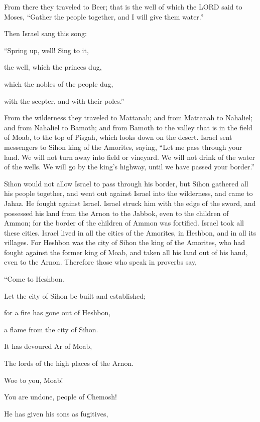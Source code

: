 \myverse{}From there they traveled to Beer; that is the well of which
the LORD said to Moses, “Gather the people together, and I will give them water.”


\myverse{}Then Israel sang this song:

“Spring up, well! Sing to it,


\myverse{}the well, which the princes dug,

which the nobles of the people dug,

with the scepter, and with their poles.”

From the wilderness they traveled to Mattanah;
\myverse{}and from Mattanah to Nahaliel; and from Nahaliel to Bamoth;
\myverse{}and from Bamoth to the valley that is in the field of Moab, to the top of
Pisgah, which looks down on the desert.
\myverse{}Israel sent messengers to Sihon king of the Amorites, saying,
\myverse{}“Let me pass through your land. We will not turn away into field or vineyard.
We will not drink of the water of the wells. We will go by the king’s highway, until we have passed your
border.”


\myverse{}Sihon would not allow Israel to pass through his border, but
Sihon gathered all his people together, and went out against Israel into the wilderness, and came to Jahaz.
He fought against Israel.
\myverse{}Israel struck him with the edge of the sword, and possessed his land from
the Arnon to the Jabbok, even to the children of Ammon; for the border of the children of Ammon was fortified.
\myverse{}Israel took all these cities. Israel lived in all the cities of the Amorites,
in Heshbon, and in all its villages.
\myverse{}For Heshbon was the city of Sihon the king of the Amorites, who had fought
against the former king of Moab, and taken all his land out of his hand, even to the Arnon.
\myverse{}Therefore those who speak in proverbs say,

“Come to Heshbon.

Let the city of Sihon be built and established;


\myverse{}for a fire has gone out of Heshbon,

a flame from the city of Sihon.

It has devoured Ar of Moab,

The lords of the high places of the Arnon.


\myverse{}Woe to you, Moab!

You are undone, people of Chemosh!

He has given his sons as fugitives,

